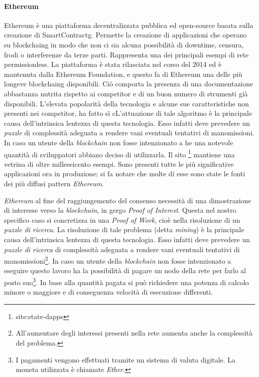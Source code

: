 \paragraph{Ethereum}
\label{cap:ETH}
Ethereum è una piattaforma decentralizzata pubblica ed open-source basata sulla creazione di \gls{SmartContractg}. Permette la creazione di applicazioni che operano su \gls{blockchaing} in modo che non ci sia alcuna possibilità di downtime, censura, frodi o interferenze da terze parti. Rappresenta una dei principali esempi di rete permissionless.
La piattaforma è stata rilasciata nel corso del 2014 ed è mantenuta dalla Ethereum Foundation, e questo fa di Ethereum una delle più longeve \gls{blockchaing} disponibili. Ciò comporta la presenza di una documentazione abbastanza nutrita rispetto ai competitor e di un buon numero di strumenti già disponibili. 
L’elevata popolarità della tecnologia e alcune sue caratteristiche non presenti nei competitor, ha fatto sì cL'attuazione di tale algoritmo è la principale causa dell'intrinsica lentezza di questa tecnologia. Esso infatti deve prevedere un \emph{puzzle} di complessità adeguata a rendere vani eventuali tentativi di manomissioni. In caso un utente della \emph{blockchain} non fosse intenzionato a he una notevole quantità di sviluppatori abbiano deciso di utilizzarla. Il sito \footnote{site:state-dapps} mantiene una vetrina di oltre milleseicento esempi. Sono presenti tutte le più significative applicazioni ora in produzione; si fa notare che molte di esse sono state le fonti dei più diffusi pattern \emph{Ethereum}.

\medskip
\emph{Ethereum} al fine del raggiungemento del consenso necessità di una dimostrazione di interesse verso la \emph{blockchain}, in gergo \emph{Proof of Interest}. Questa nel nostro specifico caso si concretizza in una  \emph{Proof of Work}, cioè nella risoluzione di un \emph{puzzle di ricerca}. 
La risoluzione di tale problema (detta \emph{mining}) è la principale causa dell'intrinsica lentezza di questa tecnologia. Esso infatti deve prevedere un \emph{puzzle di ricerca} di complessità adeguata a rendere vani eventuali tentativi di manomissioni\footnote{All'aumentare degli interessi presenti nella rete aumenta anche la complessità del problema.}. 
In caso un utente della \emph{blockchain} non fosse intenzionato a eseguire questo lavoro ha la possibilità di pagare un nodo della rete per farlo al posto suo\footnote{I pagamenti vengono effettuati tramite un sistema di valuta digitale. La moneta utilizzata è chiamate \emph{Ether}.}. In base alla quantità pagata si può richiedere una potenza di calcolo minore o maggiore e di conseguenza velocità di esecuzione differenti.


